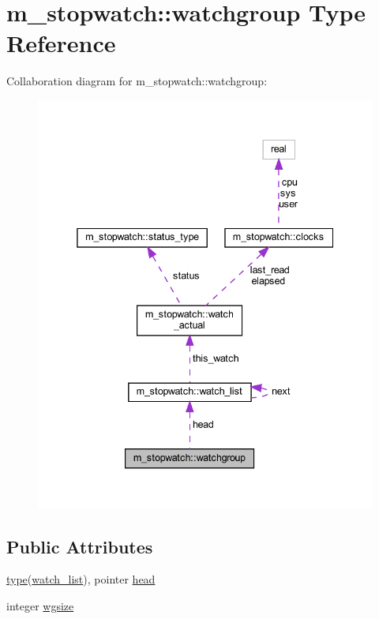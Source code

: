 \hypertarget{structm__stopwatch_1_1watchgroup}{}\section{m\+\_\+stopwatch\+:\+:watchgroup Type Reference}
\label{structm__stopwatch_1_1watchgroup}


Collaboration diagram for m\+\_\+stopwatch\+:\+:watchgroup\+:
\nopagebreak
\begin{figure}[H]
\begin{center}
\leavevmode
\includegraphics[width=338pt]{structm__stopwatch_1_1watchgroup__coll__graph}
\end{center}
\end{figure}
\subsection*{Public Attributes}
\begin{DoxyCompactItemize}
\item 
\hyperlink{stop__watch_83_8txt_a70f0ead91c32e25323c03265aa302c1c}{type}(\hyperlink{structm__stopwatch_1_1watch__list}{watch\+\_\+list}), pointer \hyperlink{structm__stopwatch_1_1watchgroup_adf624a85ac607be3ec647d44ddb8fd1e}{head}
\item 
integer \hyperlink{structm__stopwatch_1_1watchgroup_a3ecaf14bd4981f9793c7e6b524632c16}{wgsize}
\end{DoxyCompactItemize}


